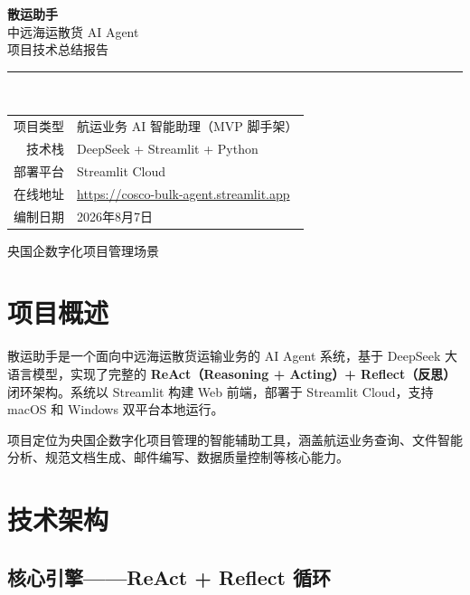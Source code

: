 \documentclass[12pt,a4paper]{ctexart}
\begin{document}
\begin{titlepage}
\centering
\vspace*{4cm}

{\Huge\bfseries 散运助手}\\[0.5cm]
{\Large 中远海运散货 AI Agent}\\[1cm]

{\large 项目技术总结报告}\\[2cm]

\rule{0.6\textwidth}{1.5pt}\\[2cm]

{\large
\begin{tabular}{rl}
项目类型 & 航运业务 AI 智能助理（MVP 脚手架） \\
技术栈   & DeepSeek + Streamlit + Python \\
部署平台 & Streamlit Cloud \\
在线地址 & \url{https://cosco-bulk-agent.streamlit.app} \\
编制日期 & 2026年8月7日
\end{tabular}
}

\vfill
{\normalsize 央国企数字化项目管理场景}
\end{titlepage}

\tableofcontents
\newpage

\section{项目概述}

散运助手是一个面向中远海运散货运输业务的 AI Agent 系统，基于 DeepSeek 大语言模型，实现了完整的 \textbf{ReAct（Reasoning + Acting）+ Reflect（反思）} 闭环架构。系统以 Streamlit 构建 Web 前端，部署于 Streamlit Cloud，支持 macOS 和 Windows 双平台本地运行。

项目定位为央国企数字化项目管理的智能辅助工具，涵盖航运业务查询、文件智能分析、规范文档生成、邮件编写、数据质量控制等核心能力。

\section{技术架构}

\subsection{核心引擎——ReAct + Reflect 循环}
\end{document}
